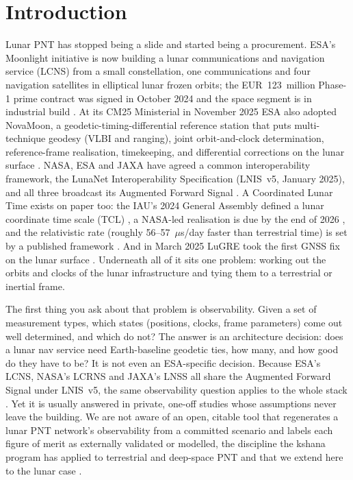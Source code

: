 \section{Introduction}

Lunar PNT has stopped being a slide and started being a procurement. ESA's
Moonlight initiative is now building a lunar communications and navigation
service (LCNS) from a small constellation, one communications and four
navigation satellites in elliptical lunar frozen orbits; the
EUR~123~million Phase-1 prime contract was signed in October 2024 and the space
segment is in industrial build \citep{esa_moonlight,telespazio2024moonlight}. At
its CM25 Ministerial in November 2025 ESA also adopted NovaMoon, a
geodetic-timing-differential reference station that puts multi-technique geodesy
(VLBI and ranging), joint orbit-and-clock determination, reference-frame
realisation, timekeeping, and differential corrections on the lunar surface
\citep{molli2026novamoon}. NASA, ESA and JAXA have agreed a common
interoperability framework, the LunaNet Interoperability Specification (LNIS~v5,
January 2025), and all three broadcast its Augmented Forward Signal
\citep{nasa2025lnis,nasa2025afs}. A Coordinated Lunar Time exists on paper too:
the IAU's 2024 General Assembly defined a lunar coordinate time scale (TCL)
\citep{iau2024lcrs}, a NASA-led realisation is due by the end of 2026
\citep{ostp2024lunartime}, and the relativistic rate (roughly
56--57~$\mu$s/day faster than terrestrial time) is set by a published framework
\citep{ashby2024lunartime}. And in March 2025 LuGRE took the first GNSS fix on
the lunar surface \citep{lugre2026}. Underneath all of it sits one problem:
working out the orbits and clocks of the lunar infrastructure and tying them to a
terrestrial or inertial frame.

The first thing you ask about that problem is observability. Given a set of
measurement types, which states (positions, clocks, frame parameters) come out
well determined, and which do not? The answer is an architecture decision: does
a lunar nav service need Earth-baseline geodetic ties, how many, and how good do
they have to be? It is not even an ESA-specific decision. Because ESA's LCNS,
NASA's LCRNS and JAXA's LNSS all share the Augmented Forward Signal under
LNIS~v5, the same observability question applies to the whole stack
\citep{nasa2025lnis}. Yet it is usually answered in private, one-off studies
whose assumptions never leave the building. We are not aware of an open, citable
tool that regenerates a lunar PNT network's observability from a committed
scenario and labels each figure of merit as externally validated or modelled,
the discipline the kshana program has applied to terrestrial and deep-space PNT
\citep{baweja2026kshana} and that we extend here to the lunar case
\citep{iiyama2023lupnt,fernandezprades2018reproducibility}.

